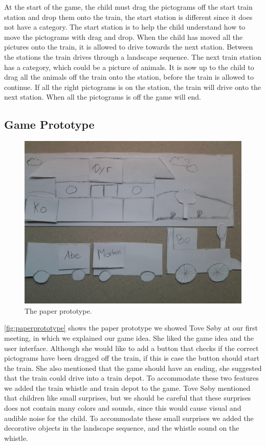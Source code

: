 At the start of the game, the child must drag the pictograms off the start train station and drop them onto the train, the start station is different since it does not have a category. The start station is to help the child understand how to move the pictograms with drag and drop. When the child has moved all the pictures onto the train, it is allowed to drive towards the next station. Between the stations the train drives through a landscape sequence. The next train station has a category, which could be a picture of animals. It is now up to the child to drag all the animals off the train onto the station, before the train is allowed to continue. If all the right pictograms is on the station, the train will drive onto the next station. When all the pictograms is off the game will end.

\subsection{Game Prototype}
\begin{figure}[H]
\centering
\includegraphics[width=0.9\linewidth]{img/screenshots/prototype1.jpg}
\caption{The paper prototype.}
\label{fig:paperprototype}
\end{figure}
\autoref{fig:paperprototype} shows the paper prototype we showed Tove Søby at our first meeting, in which we explained our game idea. She liked the game idea and the user interface. Although she would like to add a button that checks if the correct pictograms have been dragged off the train, if this is case the button should start the train. She also mentioned that the game should have an ending, she suggested that the train could drive into a train depot. To accommodate these two features we added the train whistle and train depot to the game. Tove Søby mentioned that children like small surprises, but we should be careful that these surprises does not contain many colors and sounds, since this would cause visual and audible noise for the child. To accommodate these small surprises we added the decorative objects in the landscape sequence, and the whistle sound on the whistle.

